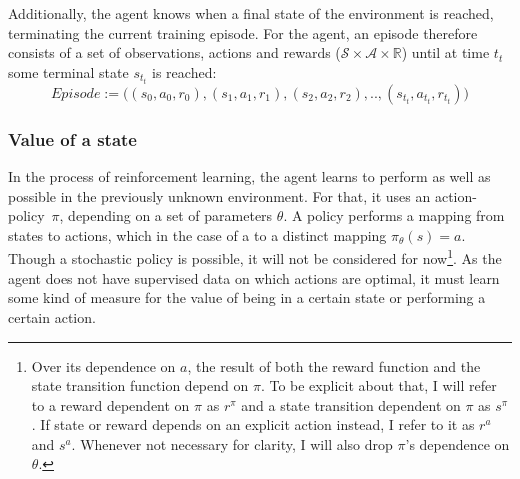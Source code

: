 Additionally, the agent knows when a final state of the environment is reached, terminating the current training episode. For the agent, an episode therefore consists of a set of observations, actions and rewards ($\mathcal{S} \times \mathcal{A} \times \mathds{R}$) until at time $t_t$ some terminal state $s_{t_t}$ is reached: $$Episode := \big((s_0, a_0, r_0), (s_1, a_1, r_1), (s_2,a_2,r_2), .., (s_{t_t}, a_{t_t}, r_{t_t})\big)$$

\subsubsection{Value of a state}

In the process of reinforcement learning, the agent learns to perform as well as possible in the previously unknown environment. For that, it uses an \mbox{action-policy $\pi$,} depending on a set of parameters $\theta$. A policy performs a mapping from states to actions, which in the case of a  to a distinct mapping $\pi_\theta(s) = a$. Though a stochastic policy is possible, it will not be considered for now\footnote{Over its dependence on $a$, the result of both the reward function and the state transition function depend on $\pi$. To be explicit about that, I will refer to a reward dependent on $\pi$ as $r^\pi$ and a state transition dependent on $\pi$ as $s^\pi$. If state or reward depends on an explicit action instead, I refer to it as $r^a$ and $s^a$. Whenever not necessary for clarity, I will also drop $\pi$'s dependence on $\theta$.}. %
As the agent does not have supervised data on which actions are optimal, it must learn some kind of measure for the value of being in a certain state or performing a certain action.

